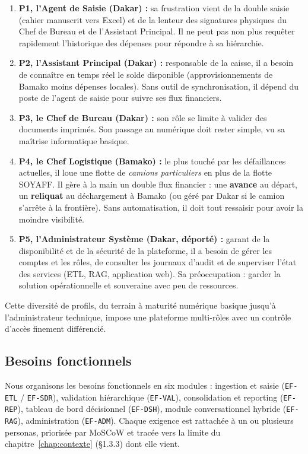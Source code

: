 \begin{enumerate}
    \item \textbf{P1, l'Agent de Saisie (Dakar) :} sa frustration vient de la double saisie (cahier manuscrit vers Excel) et de la lenteur des signatures physiques du Chef de Bureau et de l'Assistant Principal. Il ne peut pas non plus requêter rapidement l'historique des dépenses pour répondre à sa hiérarchie.
    \item \textbf{P2, l'Assistant Principal (Dakar) :} responsable de la caisse, il a besoin de connaître en temps réel le solde disponible (approvisionnements de Bamako moins dépenses locales). Sans outil de synchronisation, il dépend du poste de l'agent de saisie pour suivre ses flux financiers.
    \item \textbf{P3, le Chef de Bureau (Dakar) :} son rôle se limite à valider des documents imprimés. Son passage au numérique doit rester simple, vu sa maîtrise informatique basique.
    \item \textbf{P4, le Chef Logistique (Bamako) :} le plus touché par les défaillances actuelles, il loue une flotte de \textit{camions particuliers} en plus de la flotte SOYAFF. Il gère à la main un double flux financier : une \textbf{avance} au départ, un \textbf{reliquat} au déchargement à Bamako (ou géré par Dakar si le camion s'arrête à la frontière). Sans automatisation, il doit tout ressaisir pour avoir la moindre visibilité.
    \item \textbf{P5, l'Administrateur Système (Dakar, déporté) :} garant de la disponibilité et de la sécurité de la plateforme, il a besoin de gérer les comptes et les rôles, de consulter les journaux d'audit et de superviser l'état des services (ETL, RAG, application web). Sa préoccupation : garder la solution opérationnelle et souveraine avec peu de ressources.
\end{enumerate}

Cette diversité de profils, du terrain à maturité numérique basique jusqu'à l'administrateur technique, impose une plateforme multi-rôles avec un contrôle d'accès finement différencié.

\subsection{Besoins fonctionnels}
\label{sec:besoins_fonctionnels}
Nous organisons les besoins fonctionnels en six modules : ingestion et saisie (\texttt{EF-ETL} / \texttt{EF-SDR}), validation hiérarchique (\texttt{EF-VAL}), consolidation et reporting (\texttt{EF-REP}), tableau de bord décisionnel (\texttt{EF-DSH}), module conversationnel hybride (\texttt{EF-RAG}), administration (\texttt{EF-ADM}). Chaque exigence est rattachée à un ou plusieurs personas, priorisée par MoSCoW et tracée vers la limite du chapitre~\ref{chap:contexte} (\S1.3.3) dont elle vient.

